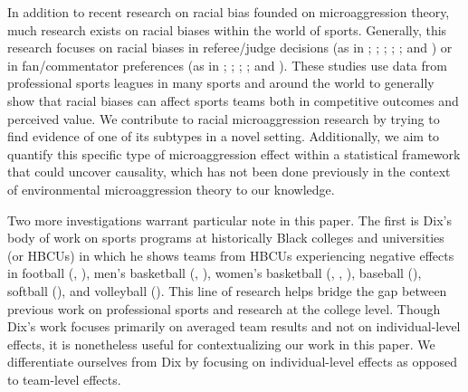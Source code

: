 \documentclass[12pt]{article}
\begin{document}
In addition to recent research on racial bias founded on microaggression theory, much research exists on racial biases within the world of sports. Generally, this research focuses on racial biases in referee/judge decisions (as in \citealp{price_wolfers_2010}; \citealp{parsons_sulaeman_yates_hamermesh_2011}; \citealp{gallo_grund_reade_2012}; \citealp{rotthoff_2020}; \citealp{eiserloh_foreman_heintz_2020}; and \citealp{pelechrinis_2023}) or in fan/commentator preferences (as in \citealp{andersen_lacroix_1991}; \citealp{preston_szymanski_2008}; \citealp{reilly_witt_2011}; \citealp{principe_vanours_2022}; and \citealp{quansah_lang_frick_2023}). These studies use data from professional sports leagues in many sports and around the world to generally show that racial biases can affect sports teams both in competitive outcomes and perceived value. We contribute to racial microaggression research by trying to find evidence of one of its subtypes in a novel setting. Additionally, we aim to quantify this specific type of microaggression effect within a statistical framework that could uncover causality, which has not been done previously in the context of environmental microaggression theory to our knowledge.

Two more investigations warrant particular note in this paper. The first is Dix’s body of work on sports programs at historically Black colleges and universities (or HBCUs) in which he shows teams from HBCUs experiencing negative effects in football (\citealp{dix_2017}, \citealp{dix_2021a}), men’s basketball (\citealp{dix_2022a}, \citealp{dix_2022b}), women’s basketball (\citealp{dix_2019}, \citealp{dix_2020a}, \citealp{dix_2022b}), baseball (\citealp{dix_2020b}), softball (\citealp{dix_2021b}), and volleyball (\citealp{dix_2023}). This line of research helps bridge the gap between previous work on professional sports and research at the college level. Though Dix's work focuses primarily on averaged team results and not on individual-level effects, it is nonetheless useful for contextualizing our work in this paper. We differentiate ourselves from Dix by focusing on individual-level effects as opposed to team-level effects.
\end{document}
